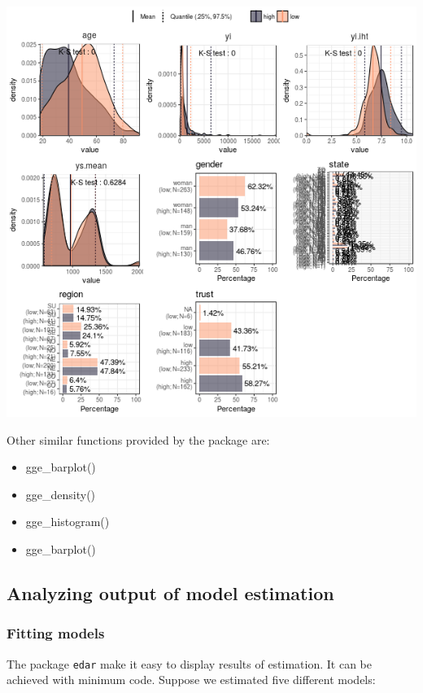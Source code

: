 \documentclass[a4paper]{article}
\begin{document}
\begin{center}
\includegraphics[width=.9\linewidth]{gge_describe_group.png}
\end{center}


Other similar functions provided by the package are:
\begin{itemize}
\item gge\_barplot()
\item gge\_density()
\item gge\_histogram()
\item gge\_barplot()
\end{itemize}
\subsection{Analyzing output of model estimation}
\label{sec:org474a1d8}
\subsubsection{Fitting models}
\label{sec:orgefd9607}

The package \texttt{edar} make it easy to display results of estimation. It can be achieved with minimum code. Suppose we estimated five different models:
\end{document}
